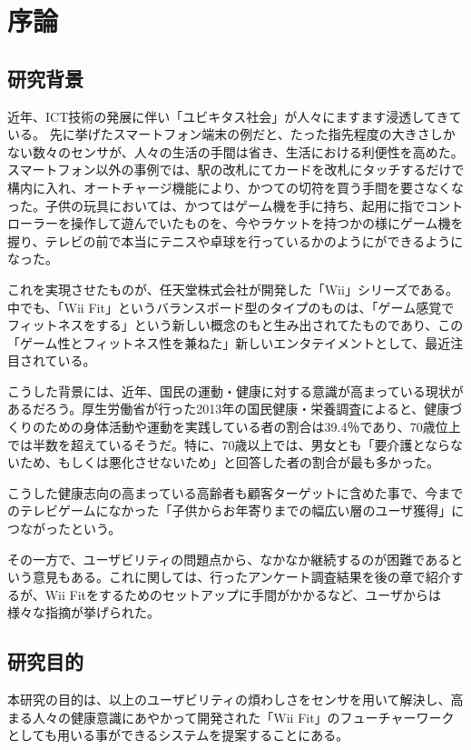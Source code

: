 \chapter{序論}
\label{chap:introduction}


\section{研究背景}

近年、ICT技術の発展に伴い「ユビキタス社会」が人々にますます浸透してきている。
先に挙げたスマートフォン端末の例だと、たった指先程度の大きさしかない数々のセンサが、人々の生活の手間は省き、生活における利便性を高めた。
スマートフォン以外の事例では、駅の改札にてカードを改札にタッチするだけで構内に入れ、オートチャージ機能により、かつての切符を買う手間を要さなくなった。子供の玩具においては、かつてはゲーム機を手に持ち、起用に指でコントローラーを操作して遊んでいたものを、今やラケットを持つかの様にゲーム機を握り、テレビの前で本当にテニスや卓球を行っているかのようにができるようになった。

これを実現させたものが、任天堂株式会社が開発した「Wii」シリーズである。中でも、「Wii Fit」というバランスボード型のタイプのものは、「ゲーム感覚でフィットネスをする」という新しい概念のもと生み出されてたものであり、この「ゲーム性とフィットネス性を兼ねた」新しいエンタテイメントとして、最近注目されている。

こうした背景には、近年、国民の運動・健康に対する意識が高まっている現状があるだろう。厚生労働省が行った2013年の国民健康・栄養調査によると、健康づくりのための身体活動や運動を実践している者の割合は39.4％であり、70歳位上では半数を超えているそうだ。特に、70歳以上では、男女とも「要介護とならないため、もしくは悪化させないため」と回答した者の割合が最も多かった。\cite{hoge02}

こうした健康志向の高まっている高齢者も顧客ターゲットに含めた事で、今までのテレビゲームになかった「子供からお年寄りまでの幅広い層のユーザ獲得」につながったという。

その一方で、ユーザビリティの問題点から、なかなか継続するのが困難であるという意見もある。これに関しては、行ったアンケート調査結果を後の章で紹介するが、Wii Fitをするためのセットアップに手間がかかるなど、ユーザからは様々な指摘が挙げられた。




\section{研究目的}

本研究の目的は、以上のユーザビリティの煩わしさをセンサを用いて解決し、高まる人々の健康意識にあやかって開発された「Wii Fit」のフューチャーワークとしても用いる事ができるシステムを提案することにある。

